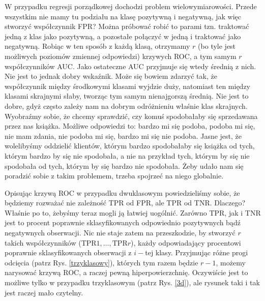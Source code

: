 \documentclass{mini}
\begin{document}
W przypadku regresji porządkowej dochodzi problem wielowymiarowości. Przede wszystkim nie mamy tu podziału na klasę pozytywną i negatywną, jak więc stworzyć współczynnik FPR? Można próbować robić to parami tzn. traktować jedną z klas jako pozytywną, a pozostałe połączyć w jedną i traktować jako negatywną. Robiąc w ten sposób z każdą klasą, otrzymamy $r$ (bo tyle jest możliwych poziomów zmiennej odpowiedzi) krzywych ROC, a tym samym $r$ współczynników AUC. Jako ostateczne AUC przyjmuje się wtedy średnią z nich. Nie jest to jednak dobry wskaźnik. Może się bowiem zdarzyć tak, że współczynnik między środkowymi klasami wyjdzie duży, natomiast ten między klasami skrajnymi słaby, tworząc tym samym nienajgorszą średnią. Nie jest to dobre, gdyż często zależy nam na dobrym odróżnieniu właśnie klas skrajnych. Wyobraźmy sobie, że chcemy sprawdzić, czy komuś spodobałaby się sprzedawana przez nas książka. Możliwe odpowiedzi to: bardzo mi się podoba, podoba mi się, nie mam zdania, nie podoba mi się, bardzo mi się nie podoba. Jasne jest, że wolelibyśmy oddzielić klientów, którym bardzo spodobałaby się książka od tych, którym bardzo by się nie spodobała, a nie na przykład tych, którym by się nie spodobała od tych, którym by się bardzo nie spodobała. Żeby udało nam się poradzić sobie z takim problemem, trzeba spojrzeć na niego globalnie.   

Opisując krzywą ROC w przypadku dwuklasowym powiedzieliśmy sobie, że będziemy rozważać nie zależność TPR od FPR, ale TPR od TNR. Dlaczego? Właśnie po to, żebyśmy teraz mogli ją łatwiej uogólnić. Zarówno TPR, jak i TNR jest to procent poprawnie sklasyfikowanych odpowiednio pozytywnych bądź negatywnych obserwacji. Nic nie staje zatem na przeszkodzie, by stworzyć $r$ takich współczynników ($\text{TPR}1, \ldots, \text{TPR}r$), każdy odpowiadający procentowi poprawnie sklasyfikowanych obserwacji z $i-$tej klasy. Przyjmując różne progi odcięcia (patrz Rys. \ref{trzyklasowy}), których tym razem będzie $r-1$, możemy narysować krzywą ROC, a raczej pewną hiperpowierzchnię. Oczywiście jest to możliwe tylko w przypadku trzyklasowym (patrz Rys. \ref{3d}), ale rysunek taki i tak jest raczej mało czytelny. 
\end{document}
